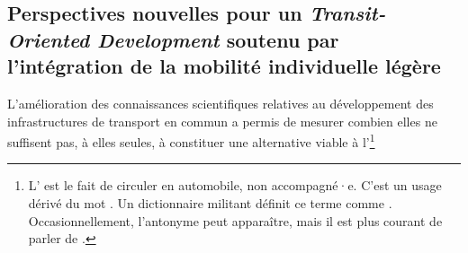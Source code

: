 \begin{refsegment}
\section{Perspectives nouvelles pour un \textsl{Transit-Oriented Development} soutenu par l'intégration de la mobilité individuelle légère
    \label{chap1:btod}
    }

L’amélioration des connaissances scientifiques relatives au développement des infrastructures de transport en commun a permis de mesurer combien elles ne suffisent pas, à elles seules, à constituer une alternative viable à l’\footnote{
    L' est le fait de circuler en automobile, non accompagné·e. C'est un usage dérivé du mot . Un dictionnaire militant définit ce terme comme  \textcolor{blue}{\autocite{carfreefr_dictionnaire_2008}}. Occasionnellement, l'antonyme  peut apparaître, mais il est plus courant de parler de .
}
\end{refsegment}
